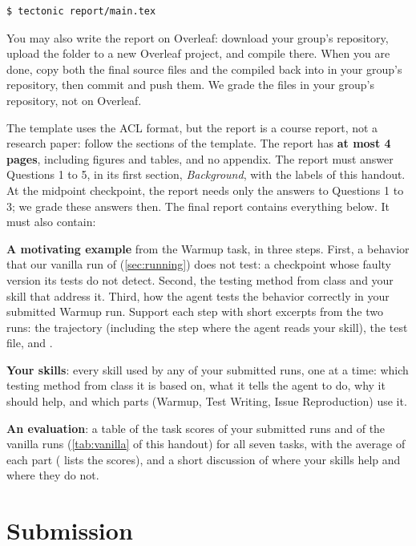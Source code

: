 \documentclass[letterpaper,11pt]{article}
\begin{document}
\begin{verbatim}
$ tectonic report/main.tex
\end{verbatim}
You may also write the report on Overleaf: download your group's repository,
upload the folder  to a new Overleaf project, and compile
 there. When you are done, copy both the final source files and
the compiled  back into  in your group's repository,
then commit and push them. We grade the files in your group's repository, not on
Overleaf.

 
The template uses the ACL format, but the report is
a course report, not a research paper: follow the sections of the template.
The report has \textbf{at most 4 pages}, including figures and tables, and no
appendix.
The report must answer Questions 1 to 5, in its first section,
\emph{Background}, with the labels of this handout. At the midpoint
checkpoint, the report needs only the answers to Questions 1 to 3; we grade
these answers then. The final report contains everything below. It must also contain:
\squishlist
 \item \textbf{A motivating example} from the Warmup task, in three steps.
   First, a behavior that our vanilla run of 
   (\autoref{sec:running}) does not test: a checkpoint whose faulty version
   its tests do not detect. Second, the testing method from class and your
   skill that address it. Third, how the agent tests the behavior correctly
   in your submitted Warmup run. Support each step with short excerpts from
   the two runs: the trajectory (including the step where the agent reads
   your skill), the test file, and .
 \item \textbf{Your skills}: every skill used by any of your submitted runs,
   one at a time: which testing method from class it is based on, what it
   tells the agent to do, why it should help, and which parts (Warmup, Test
   Writing, Issue Reproduction) use it.
 \item \textbf{An evaluation}: a table of the task scores of your submitted
   runs and of the vanilla runs (\autoref{tab:vanilla} of this handout) for all seven tasks,
   with the average of each part ( lists
   the scores), and a short discussion of where your skills
   help and where they do not.
\squishend

\section{Submission}
\label{sec:submission}
\end{document}
